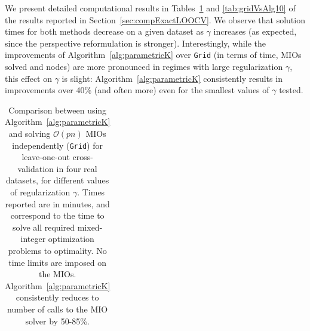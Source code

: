 \documentclass[mnsc,nonblindrev]{informs3} %
\begin{document}
We present detailed computational results in Tables~\ref{tab:gridVsAlg} and \ref{tab:gridVsAlg10} of the results reported in Section~\ref{sec:compExactLOOCV}. We observe that solution times for both methods decrease on a given dataset as $\gamma$ increases (as expected, since the perspective reformulation is stronger). Interestingly, while the improvements of Algorithm~\ref{alg:parametricK} over \texttt{Grid} (in terms of time, MIOs solved and nodes) are more pronounced in regimes with large regularization $\gamma$, this effect on $\gamma$ is slight: Algorithm~\ref{alg:parametricK} consistently results in improvements over 40\% (and often more) even for the smallest values of $\gamma$ tested.
\begin{center}
	\begin{table}[h!]\footnotesize
 \caption{Comparison between using Algorithm~\ref{alg:parametricK} and solving $\mathcal{O}(pn)$ MIOs independently (\texttt{Grid}) for leave-one-out cross-validation in four real datasets, for different values of regularization $\gamma$. Times reported are in minutes, and correspond to the time to solve all required mixed-integer optimization problems to optimality. No time limits are imposed on the MIOs. Algorithm~\ref{alg:parametricK} consistently reduces to number of calls to the MIO solver by 50-85\%.}
 \label{tab:gridVsAlg}
	\setlength{\tabcolsep}{2pt}
	\begin{tabular}{l r r r|r r r | r r r  | r r r }
		

\end{tabular}
\end{table}
\end{center}
\end{document}
